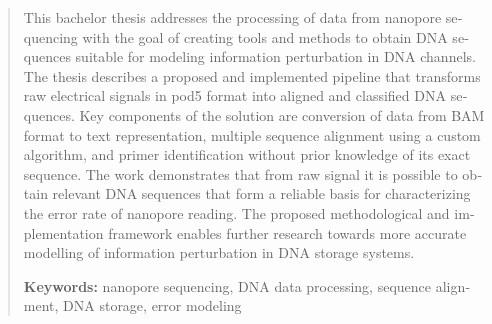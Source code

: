 \begin{otherlanguage}{english}
\begin{abstract}

This bachelor thesis addresses the processing of data from nanopore sequencing with the goal 
of creating tools and methods to obtain DNA sequences suitable for modeling information perturbation in DNA 
channels. The thesis describes a proposed and implemented pipeline that transforms raw electrical signals 
in pod5 format into aligned and classified DNA sequences. Key components of the solution are conversion of 
data from BAM format to text representation, multiple sequence alignment using a custom algorithm, and primer 
identification without prior knowledge of its exact sequence. The work demonstrates that from raw signal it is possible to obtain relevant DNA sequences that form a reliable 
basis for characterizing the error rate of nanopore reading. The proposed methodological and implementation 
framework enables further research towards more accurate modelling of information perturbation in DNA storage 
systems.

\smallskip

\noindent\textbf{Keywords:} nanopore sequencing, DNA data processing, sequence alignment, DNA storage, error modeling

\end{abstract}
\end{otherlanguage}